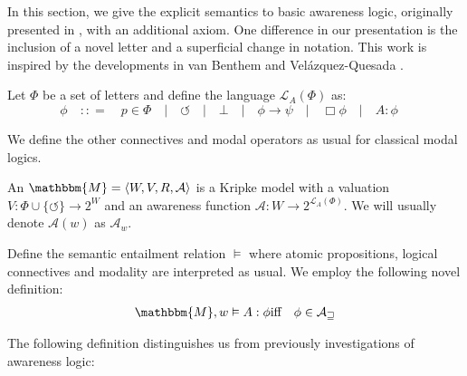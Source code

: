 In this section, we give the explicit semantics to basic awareness logic,
originally presented in {\cite{fagin_belief_1987}}, with an additional axiom.
 One difference in our presentation is the inclusion of a novel letter and a
superficial change in notation.  This work is inspired by the developments in
van Benthem and Vel\'azquez-Quesada {\cite{van_benthem_inference_2009}}.

\begin{definition}
  Let $\Phi$ be a set of letters and define the language $\mathcal{L}_A
  (\Phi)$ as:
  \[ \phi \hspace{1em} : : = \hspace{1em} p \in \Phi \hspace{1em} |
     \hspace{1em} \circlearrowleft \hspace{1em} | \hspace{1em} \bot
     \hspace{1em} | \hspace{1em} \phi \rightarrow \psi \hspace{1em} |
     \hspace{1em} \Box \phi \hspace{1em} | \hspace{1em} A : \phi \hspace{1em}
  \]
\end{definition}

We define the other connectives and modal operators as usual for classical
modal logics.

\begin{definition}
  \label{awarenessmodels}An {} $\mathbbm{M}= \langle
  W, V, R, \mathcal{A} \rangle$ is a Kripke model with a valuation $V : \Phi
  \cup \{\circlearrowleft\} \rightarrow 2^W$ and an awareness function
  $\mathcal{A} : W \rightarrow 2^{\mathcal{L}_A (\Phi)}$.  We will usually
  denote $\mathcal{A} (w)$ as $\mathcal{A}_w$.
  
  
  
  Define the semantic entailment relation $\vDash$ where atomic propositions,
  logical connectives and modality are interpreted as usual.  We employ the
  following novel definition:
  \begin{eqnarray*}
    \mathbbm{M}, w \vDash A : \phi & \text{iff} & \phi \in \mathcal{A_w}
  \end{eqnarray*}
\end{definition}

The following definition distinguishes us from previously investigations of
awareness logic:

